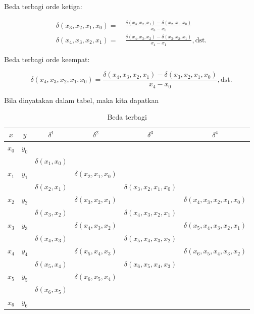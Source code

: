 Beda terbagi orde ketiga:

\begin{equation*}
\begin{split}
\delta(x_3, x_2, x_1, x_0) =~& \frac{\delta(x_3,x_2,x_1)-\delta(x_2,x_1,x_0)}{x_3 - x_0}\\
\delta(x_4, x_3, x_2, x_1) =~& \frac{\delta(x_4,x_3,x_2)-\delta(x_3,x_2,x_1)}{x_4 - x_1}, \text{dst.}
\end{split}
\end{equation*}

Beda terbagi orde keempat:

\begin{equation*}
\delta(x_4,x_3,x_2,x_1,x_0) = \frac{\delta (x_4,x_3,x_2,x_1)-\delta(x_3,x_2,x_1,x_0)}{x_4 - x_0}, \text{dst.}
\end{equation*}

Bila dinyatakan dalam tabel, maka kita dapatkan

\begin{table}[!htbp]
\centering
\caption{Beda terbagi}
\label{tabel:BedaTerbagi}
\begin{tabular}{@{}|c|c|c|c|c|c|@{}}
\hline
$x$ & $y$ & $\delta^1$ & $\delta^2$ & $\delta^3$ & $\delta^4$\\\hline
$x_0$ & $y_0$ & & & & \\
 & & $\delta(x_1,x_0)$ & & & \\
$x_1$ & $y_1$ & & $\delta(x_2,x_1,x_0)$ & & \\
 & & $\delta(x_2,x_1)$ & & $\delta(x_3,x_2,x_1,x_0)$ &\\
$x_2$ & $y_2$ & & $\delta(x_3,x_2,x_1)$ & & $\delta(x_4,x_3,x_2,x_1,x_0)$\\
 & & $\delta(x_3,x_2)$ & & $\delta(x_4,x_3,x_2,x_1)$ &\\
$x_3$ & $y_3$ & & $\delta(x_4,x_3,x_2)$ & & $\delta(x_5,x_4,x_3,x_2,x_1)$\\
 & & $\delta(x_4,x_3)$ & & $\delta(x_5,x_4,x_3,x_2)$ &\\
$x_4$ & $y_4$ & & $\delta(x_5,x_4,x_3)$ & & $\delta(x_6,x_5,x_4,x_3,x_2)$\\
 & & $\delta(x_5,x_4)$ & & $\delta(x_6,x_5,x_4,x_3)$ &\\
$x_5$ & $y_5$ & & $\delta(x_6,x_5,x_4)$ & & \\
 & & $\delta(x_6,x_5)$ & & & \\
$x_6$ & $y_6$ & & & & \\\hline
\end{tabular}
\end{table}

